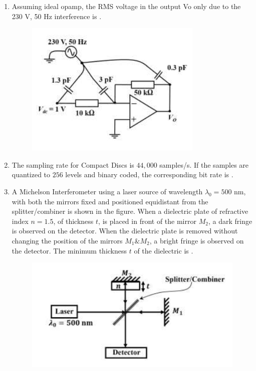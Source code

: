 \documentclass[journal,12pt,onecolumn]{IEEEtran}
\theoremstyle{remark}
\begin{document}
\begin{enumerate}
    \hfill{}

    \item Assuming ideal opamp, the RMS voltage  in the output Vo only due to the 230 V, 50 Hz interference is  \underline{\hspace{2cm}}.
    \begin{figure}[H]
        \centering
        \includegraphics[width=0.7\columnwidth]{q52.png}
        \caption*{}
        \label{fig:q52}
    \end{figure}
    
    \hfill{}

    \item The sampling rate for Compact Discs  is $44,000$ samples/s. If the samples are quantized to $256$ levels and binary coded, the corresponding bit rate  is \underline{\hspace{2cm}}.
    
    \hfill{}

    \item A Michelson Interferometer using a laser source of wavelength $\lambda_0 = 500$ nm, with both the mirrors  fixed and positioned equidistant from the splitter/combiner is shown in the figure. When a dielectric plate of refractive index $n = 1.5$, of thickness $t$, is placed in front of the mirror $M_2$, a dark fringe is observed on the detector. When the dielectric plate is removed without changing the position of the mirrors $M_1\& M_2$, a bright fringe is observed on the detector. The minimum thickness $t$  of the dielectric is \underline{\hspace{2cm}}.
    \begin{figure}[H]
        \centering
        \includegraphics[width=0.5\columnwidth]{q54.png}
        \caption*{}
        \label{fig:q54}
    \end{figure}
    

\end{enumerate}
\end{document}
